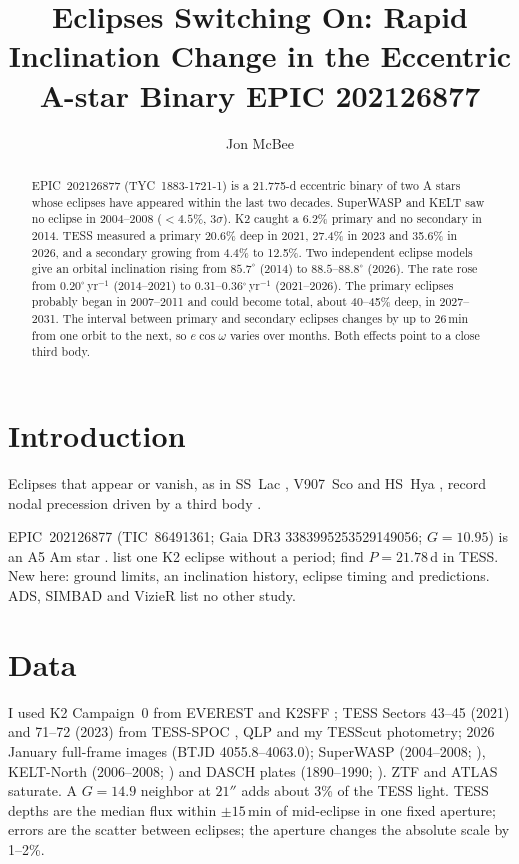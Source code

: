 \documentclass{aastex701}
\begin{document}
\title{Eclipses Switching On: Rapid Inclination Change in the Eccentric A-star Binary EPIC 202126877}

\author[orcid=0009-0000-7524-4470]{Jon McBee}

\begin{abstract}
EPIC~202126877 (TYC~1883-1721-1) is a 21.775-d eccentric binary of two A stars whose eclipses have
appeared within the last two decades. SuperWASP and KELT saw no eclipse in 2004--2008 ($<4.5\%$, $3\sigma$).
K2 caught a 6.2\% primary and no secondary in 2014. TESS measured a primary 20.6\% deep in 2021, 27.4\% in
2023 and 35.6\% in 2026, and a secondary growing from 4.4\% to 12.5\%. Two independent eclipse models give an
orbital inclination rising from $85.7^\circ$ (2014) to $88.5$--$88.8^\circ$ (2026). The rate rose from
$0.20^\circ$\,yr$^{-1}$ (2014--2021) to 0.31--0.36$^\circ$\,yr$^{-1}$ (2021--2026). The primary eclipses
probably began in 2007--2011 and could become total, about 40--45\% deep, in 2027--2031. The interval between
primary and secondary eclipses changes by up to 26\,min from one orbit to the next, so $e\cos\omega$ varies
over months. Both effects point to a close third body.
\end{abstract}


\section{Introduction}

Eclipses that appear or vanish, as in SS~Lac \citep{Torres2000}, V907~Sco \citep{Zasche2023} and HS~Hya
\citep{Davenport2021}, record nodal precession driven by a third body \citep{Borkovits2016}.

EPIC~202126877 (TIC~86491361; Gaia DR3 3383995253529149056; $G=10.95$) is an A5 Am star \citep{Shang2022}.
\citet{LaCourse2015} list one K2 eclipse without a period; \citet{IJspeert2024} find $P=21.78$\,d in TESS.
New here: ground limits, an inclination history, eclipse timing and predictions. ADS, SIMBAD and
VizieR list no other study.

\section{Data}

I used K2 Campaign~0 \citep[2014 May;][]{Howell2014} from EVEREST \citep{Luger2016} and K2SFF
\citep{Vanderburg2014}; TESS Sectors 43--45 (2021) and 71--72 (2023) from TESS-SPOC \citep{Caldwell2020}, QLP
\citep{Huang2020} and my TESScut \citep{Brasseur2019} photometry; 2026 January full-frame images (BTJD
4055.8--4063.0); SuperWASP (2004--2008; \citealt{Pollacco2006,Butters2010}), KELT-North
(2006--2008; \citealt{Pepper2007}) and DASCH plates (1890--1990; \citealt{Grindlay2012}). ZTF and ATLAS
saturate. A $G=14.9$ neighbor at $21''$ adds about 3\% of the TESS light. TESS depths are the median flux within
$\pm15$\,min of mid-eclipse in one fixed aperture; errors are the scatter between eclipses; the aperture changes
the absolute scale by 1--2\%.
\end{document}

